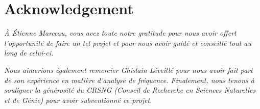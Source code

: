 \section*{Acknowledgement}
\begin{center}
	\vspace{8cm}
	
	\textit{À Étienne Marceau, vous avez toute notre gratitude pour nous avoir offert l'opportunité de faire un tel projet et pour nous avoir guidé et conseillé tout au long de celui-ci.} \\
	\vspace{0.5cm}
	
	\textit{Nous aimerions également remercier Ghislain Léveillé pour nous avoir fait part de son expérience en matière d'analyse de fréquence. Finalement, nous tenons à souligner la générosité du CRSNG (Conseil de Recherche en Sciences Naturelles et de Génie) pour avoir subventionné ce projet.}
\end{center}